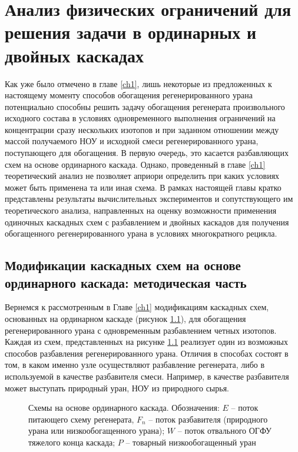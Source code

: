 \chapter{Анализ физических ограничений для решения задачи в ординарных и двойных каскадах}\label{ch:ch2}

Как уже было отмечено в главе \ref{ch1}, лишь некоторые из предложенных к настоящему моменту способов обогащения регенерированного урана потенциально способны решить задачу обогащения регенерата произвольного исходного состава в условиях одновременного выполнения ограничений на концентрации сразу нескольких изотопов и при заданном отношении между массой получаемого НОУ и исходной смеси регенерированного урана, поступающего для обогащения. В первую очередь, это касается разбавляющих схем на основе ординарного каскада. 
Однако, проведенный в главе \ref{ch1} теоретический анализ не позволяет априори определить при каких условиях может быть применена та или иная схема. В рамках настоящей главы кратко представлены результаты вычислительных экспериментов и сопутствующего им теоретического анализа, направленных на оценку возможности применения одиночных каскадных схем с разбавлением и двойных каскадов для получения обогащенного регенерированного урана в условиях многократного рецикла. 

\section{Модификации каскадных схем на основе ординарного каскада: методическая часть}\label{ch2_stat}

Вернемся к рассмотренным в Главе \ref{ch1} модификациям каскадных схем, основанных на ординарном каскаде (рисунок \ref{fig:diagram1ch3}), для обогащения регенерированного урана с одновременным разбавлением четных изотопов. Каждая из схем, представленных на рисунке \ref{fig:diagram1ch3} реализует один из возможных способов разбавления регенерированного урана. Отличия в способах состоят в том, в каком именно узле осуществляют разбавление регенерата, либо в  используемой в качестве разбавителя смеси. Например, в качестве разбавителя может выступать природный уран, НОУ из природного сырья.


\begin{figure}[ht]
  \caption{Схемы на основе ординарного каскада. Обозначения: $E$ -- поток питающего схему регенерата, $F_n$ -- поток разбавителя (природного урана или низкообогащенного урана); $W$ -- поток отвального ОГФУ тяжелого конца каскада; $P$ -- товарный низкообогащенный уран}\label{fig:diagram1ch3}
\end{figure}

